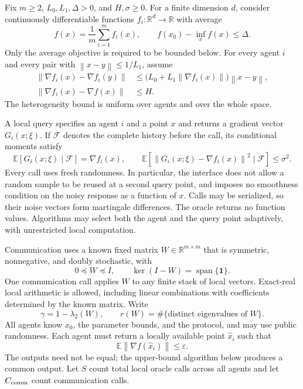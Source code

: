 \documentclass[11pt,a4paper]{article}
\newcommand{\R}{\mathbb{R}}
\newcommand{\E}{\mathbb{E}}
\newcommand{\eps}{\varepsilon}
\newcommand{\norm}[1]{\left\lVert #1\right\rVert}
\newcommand{\one}{\mathbf{1}}
\theoremstyle{remark}
\begin{document}
Fix $m\ge2$, $L_0,L_1,\Delta>0$, and $H,\sigma\ge0$.
For a finite dimension $d$, consider continuously differentiable functions
$f_i:\R^d\to\R$ with average
\[
 f(x)=\frac1m\sum_{i=1}^m f_i(x),\qquad
 f(x_0)-\inf_x f(x)\le\Delta.
\]
Only the average objective is required to be bounded below. For every agent
$i$ and every pair with $\norm{x-y}\le1/L_1$, assume
\begin{align}
 \norm{\nabla f_i(x)-\nabla f_i(y)}
 &\le\bigl(L_0+L_1\norm{\nabla f_i(x)}\bigr)\norm{x-y},
 \label{eq:local-relaxed}\\
 \norm{\nabla f_i(x)-\nabla f(x)}&\le H.
 \label{eq:heterogeneity}
\end{align}
The heterogeneity bound is uniform over agents and over the whole space.

A local query specifies an agent $i$ and a point $x$ and returns a gradient
vector $G_i(x;\xi)$. If $\mathcal F$ denotes the complete history before the
call, its conditional moments satisfy
\begin{equation}
 \E[G_i(x;\xi)\mid\mathcal F]=\nabla f_i(x),\qquad
 \E[\norm{G_i(x;\xi)-\nabla f_i(x)}^2\mid\mathcal F]\le\sigma^2.
 \label{eq:oracle-model}
\end{equation}
Every call uses fresh randomness. In particular, the interface does not
allow a random sample to be reused at a second query point, and imposes no
smoothness condition on the noisy response as a function of $x$.
Calls may be serialized, so their noise vectors form martingale differences.
The oracle returns no function values. Algorithms may select both the
agent and the query point adaptively, with unrestricted local computation.

Communication uses a known fixed matrix $W\in\R^{m\times m}$ that is
symmetric, nonnegative, and doubly stochastic, with
\[
 0\preceq W\preceq I,\qquad
 \ker(I-W)=\operatorname{span}\{\one\}.
\]
One communication call applies $W$ to any finite stack of local vectors.
Exact-real local arithmetic is allowed, including linear combinations with
coefficients determined by the known matrix. Write
\begin{equation}
 \gamma=1-\lambda_2(W),\qquad
 r(W)=\#\{\text{distinct eigenvalues of }W\}.
 \label{eq:network-parameters}
\end{equation}
All agents know $x_0$, the parameter bounds, and the protocol, and may use
public randomness. Each agent must return a locally available point
$\widehat x_i$ such that
\begin{equation}
 \E\norm{\nabla f(\widehat x_i)}\le\eps.
 \label{eq:output-criterion}
\end{equation}
The outputs need not be equal; the upper-bound algorithm below produces a
common output. Let $S$ count total local oracle calls across all agents and
let $C_{\rm comm}$ count communication calls.
\end{document}
